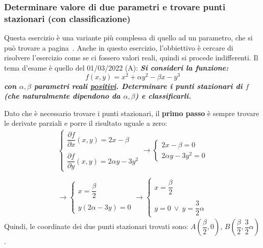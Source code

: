 \documentclass[a4paper]{article}
\begin{document}
	\subsubsection{Determinare valore di due parametri e trovare punti stazionari (con classificazione)}

	Questa esercizio è una variante più complessa di quello ad un parametro, che si può trovare a pagina~\pageref{par: determinare valore di un parametro così da trovare un punto critico}. Anche in questo esercizio, l'obbiettivo è cercare di risolvere l'esercizio come se ci fossero valori reali, quindi si procede indifferenti. Il tema d'esame è quello del 01/03/2022 (A): \textcolor{Green4}{\textbf{\emph{Si consideri la funzione:}}
	\begin{equation*}
		f\left(x,y\right) = x^{2} + \alpha y^{2} - \beta x - y^{3}
	\end{equation*}
	\textbf{\emph{con $\alpha,\beta$ parametri reali \underline{positivi}. Determinare i punti stazionari di $f$ (che naturalmente dipendono da $\alpha,\beta$) e classificarli.}}}\newline

	\noindent
	Dato che è necessario trovare i punti stazionari, il \textbf{primo passo} è sempre trovare le derivate parziali e porre il risultato uguale a zero:\
	\begin{gather*}
		\begin{cases}
			\dfrac{\partial f}{\partial x}\left(x,y\right) = 2x - \beta \\
			\\
			\dfrac{\partial f}{\partial y}\left(x,y\right) = 2\alpha y - 3y^{2}
		\end{cases}
		\longrightarrow
		\begin{cases}
			2x-\beta = 0 \\
			2\alpha y - 3y^{2} = 0
		\end{cases} \\
		\\
		\longrightarrow
		\begin{cases}
			x = \dfrac{\beta}{2} \\
			\\
			y\left(2\alpha - 3y\right) = 0
		\end{cases}
		\longrightarrow
		\begin{cases}
			x = \dfrac{\beta}{2} \\
			\\
			y = 0 \: \lor \: y = \dfrac{3}{2}\alpha
		\end{cases}
	\end{gather*}
	Quindi, le coordinate dei due punti stazionari trovati sono: $A\left(\dfrac{\beta}{2}, 0\right)$, $B\left(\dfrac{\beta}{2}, \dfrac{3}{2}\alpha\right)$.\newline
\end{document}
